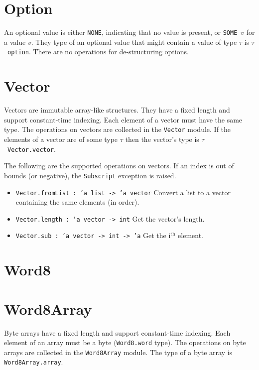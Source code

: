 \documentclass[12pt,a4paper]{book}
\begin{document}
\section{Option} An optional value is either \texttt{NONE}, indicating that no value is present, or \texttt{SOME}\ $v$ for a value $v$. They type of an optional value that might contain a value of type $\tau$ is $\tau$\ \texttt{option}. There are no operations for de-structuring options.

\section{Vector}

Vectors are immutable array-like structures. They have a fixed length and support constant-time indexing. Each element of a vector must have the same type. The operations on vectors are collected in the \texttt{Vector} module. If the elements of a vector are of some type $\tau$ then the vector's type is $\tau$\ \texttt{Vector.vector}.

The following are the supported operations on vectors. If an index is out of bounds (or negative), the \texttt{Subscript} exception is raised.
\begin{itemize}
\item \texttt{Vector.fromList : 'a list -> 'a vector} Convert a list to a vector containing the same elements (in order).
\item \texttt{Vector.length : 'a vector -> int} Get the vector's length.
\item \texttt{Vector.sub : 'a vector -> int -> 'a} Get the i$^\textrm{th}$ element.
\end{itemize}

\section{Word8}

\section{Word8Array}
Byte arrays have a fixed length and support constant-time indexing. Each element of an array must be a byte (\texttt{Word8.word} type). The operations on byte arrays are collected in the \texttt{Word8Array} module. The type of a byte array is \texttt{Word8Array.array}.
\end{document}
